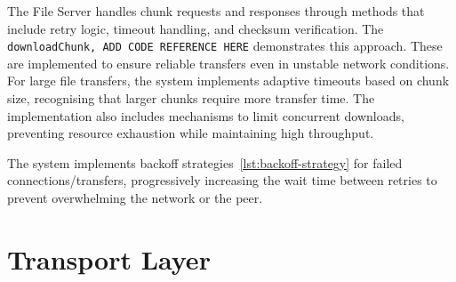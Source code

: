 \documentclass[12pt,a4paper]{report}
\begin{document}
The File Server handles chunk requests and responses through methods that include retry logic, timeout handling, and checksum verification. The \texttt{downloadChunk, ADD CODE REFERENCE HERE} demonstrates this approach. These are implemented to ensure reliable transfers even in unstable network conditions. For large file transfers, the system implements adaptive timeouts based on chunk size, recognising that larger chunks require more transfer time. The implementation also includes mechanisms to limit concurrent downloads, preventing resource exhaustion while maintaining high throughput.

The system implements backoff strategies~\ref{lst:backoff-strategy} for failed connections/transfers, progressively increasing the wait time between retries to prevent overwhelming the network or the peer.

\section{Transport Layer}
\end{document}
